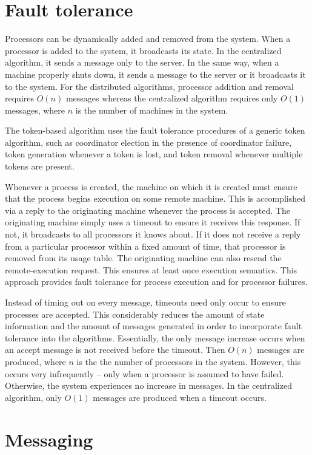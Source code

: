 \documentclass{report}
\begin{document}
\section{Fault tolerance}

Processors can be dynamically added and removed from the system.  When a
processor is added to the system, it broadcasts its state.  In the
centralized algorithm, it sends a message only to the server.  In the same
way, when a machine properly shuts down, it sends a message to the server or
it broadcasts it to the system.  For the distributed algorithms, processor
addition and removal requires $O(n)$ messages whereas the centralized
algorithm requires only $O(1)$ messages, where $n$ is the number of machines
in the system.

The token-based algorithm uses the fault tolerance procedures of a generic
token algorithm, such as coordinator election in the presence of coordinator
failure, token generation whenever a token is lost, and token removal
whenever multiple tokens are present.

Whenever a process is created, the machine on which it is created must
ensure that the process begins execution on some remote machine.  This is
accomplished via a reply to the originating machine whenever the process is
accepted.  The originating machine simply uses a timeout to ensure it
receives this response.  If not, it broadcasts to all processors it knows
about.  If it does not receive a reply from a particular processor within a
fixed amount of time, that processor is removed from its usage table.  The
originating machine can also resend the remote-execution request.  This
ensures at least once execution semantics.  This approach provides fault
tolerance for process execution and for processor failures.

Instead of timing out on every message, timeouts need only occur to ensure
processes are accepted.  This considerably reduces the amount of state
information and the amount of messages generated in order to incorporate
fault tolerance into the algorithms.  Essentially, the only message increase
occurs when an accept message is not received before the timeout.  Then
$O(n)$ messages are produced, where $n$ is the the number of processors in
the system.  However, this occurs very infrequently -- only when a processor
is assumed to have failed.  Otherwise, the system experiences no increase in
messages.  In the centralized algorithm, only $O(1)$ messages are produced
when a timeout occurs.


\section{Messaging}
\end{document}

